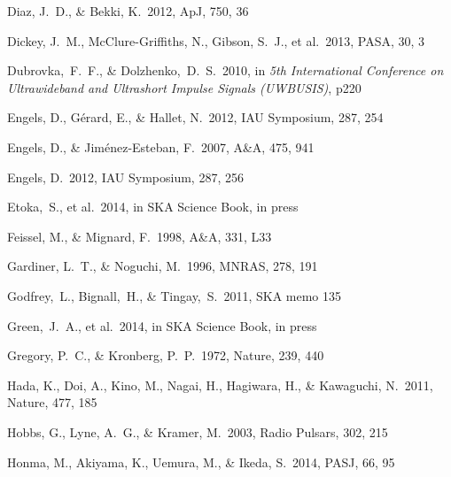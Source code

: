 \begin{thebibliography}{99}
\begin{multicols}{2}
{%

 Diaz, J.~D., \& Bekki, K.\ 2012, ApJ, 750, 36 

 Dickey, J.~M., McClure-Griffiths, N., Gibson, S.~J., et al.\ 2013, PASA, 30, 3 

Dubrovka,~F.~F., \& Dolzhenko,~D.~S.\ 2010, in {\it 5th International Conference on 
Ultrawideband and Ultrashort Impulse Signals (UWBUSIS)}, p220

 Engels, D., G{\'e}rard, E., \& Hallet, N.\ 2012, IAU Symposium, 287, 254 

 Engels, D., \& Jim{\'e}nez-Esteban, F.\ 2007, A\&A, 475, 941 

 Engels, D.\ 2012, IAU Symposium, 287, 256 

 Etoka,~S., et al.\ 2014, in SKA Science Book, in press

 Feissel, M., \& Mignard, F.\ 1998, A\&A, 331, L33 

 Gardiner, L.~T., \& Noguchi, M.\ 1996, MNRAS, 278, 191 

 Godfrey,~L., Bignall,~H., \& Tingay,~S.\ 2011, SKA memo 135

 Green,~J.~A., et al.\ 2014, in SKA Science Book, in press

 Gregory, P.~C., \& Kronberg, P.~P.\ 1972, Nature, 239, 440 


Hada, K., Doi, A., Kino, M., Nagai, H., Hagiwara, H., \& Kawaguchi, N.\ 2011, Nature, 477, 185

 Hobbs, G., Lyne, A.~G., \& Kramer, M.\ 2003, Radio Pulsars, 302, 215 

 Honma, M., Akiyama, K., Uemura, M., \& Ikeda, S.\ 2014, PASJ, 66, 95 

}
\end{multicols}
\end{thebibliography}
